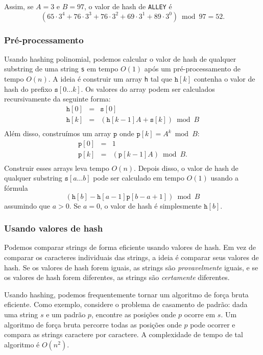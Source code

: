 Assim, se $A=3$ e $B=97$, o valor de hash de \texttt{ALLEY} é
\[(65 \cdot 3^4 + 76 \cdot 3^3 + 76 \cdot 3^2 + 69 \cdot 3^1 + 89 \cdot 3^0) \bmod 97 = 52.\]

\subsubsection*{Pré-processamento}

Usando hashing polinomial, podemos calcular o valor de hash de qualquer substring de uma string \texttt{s} em tempo $O(1)$ após um pré-processamento de tempo $O(n)$. A ideia é construir um array \texttt{h} tal que $\texttt{h}[k]$ contenha o valor de hash do prefixo $\texttt{s}[0 \ldots k]$. Os valores do array podem ser calculados recursivamente da seguinte forma:
\[
\begin{array}{lcl}
\texttt{h}[0] & = & \texttt{s}[0] \\
\texttt{h}[k] & = & (\texttt{h}[k-1] A + \texttt{s}[k]) \bmod B \\
\end{array}
\]
Além disso, construímos um array $\texttt{p}$ onde $\texttt{p}[k]=A^k \bmod B$:
\[
\begin{array}{lcl}
\texttt{p}[0] & = & 1 \\
\texttt{p}[k] & = & (\texttt{p}[k-1] A) \bmod B. \\
\end{array}
\]
Construir esses arrays leva tempo $O(n)$. Depois disso, o valor de hash de qualquer substring $\texttt{s}[a \ldots b]$ pode ser calculado em tempo $O(1)$ usando a fórmula
\[(\texttt{h}[b]-\texttt{h}[a-1] \texttt{p}[b-a+1]) \bmod B\]
assumindo que $a>0$. Se $a=0$, o valor de hash é simplesmente $\texttt{h}[b]$.

\subsubsection*{Usando valores de hash}

Podemos comparar strings de forma eficiente usando valores de hash. Em vez de comparar os caracteres individuais das strings, a ideia é comparar seus valores de hash. Se os valores de hash forem iguais, as strings são \emph{provavelmente} iguais, e se os valores de hash forem diferentes, as strings são \emph{certamente} diferentes.

Usando hashing, podemos frequentemente tornar um algoritmo de força bruta eficiente. Como exemplo, considere o problema de casamento de padrão: dada uma string $s$ e um padrão $p$, encontre as posições onde $p$ ocorre em $s$. Um algoritmo de força bruta percorre todas as posições onde $p$ pode ocorrer e compara as strings caractere por caractere. A complexidade de tempo de tal algoritmo é $O(n^2)$.

